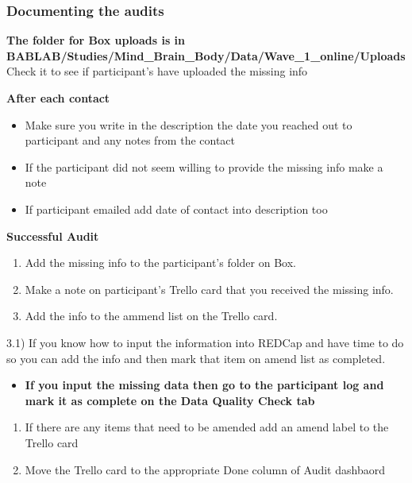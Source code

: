 \documentclass[
]{book}
\providecommand{\tightlist}{%
  \setlength{\itemsep}{0pt}\setlength{\parskip}{0pt}}
\begin{document}
\hypertarget{documenting-the-audits-1}{%
\subsubsection{\texorpdfstring{\textbf{Documenting the audits}}{Documenting the audits}}\label{documenting-the-audits-1}}

\textbf{The folder for Box uploads is in BABLAB/Studies/Mind\_Brain\_Body/Data/Wave\_1\_online/Uploads} Check it to see if participant's have uploaded the missing info

\textbf{After each contact}

\begin{itemize}
\item
  Make sure you write in the description the date you reached out to participant and any notes from the contact
\item
  If the participant did not seem willing to provide the missing info make a note
\item
  If participant emailed add date of contact into description too
\end{itemize}

\textbf{Successful Audit}

\begin{enumerate}
\def\labelenumi{\arabic{enumi})}
\item
  Add the missing info to the participant's folder on Box.
\item
  Make a note on participant's Trello card that you received the missing info.
\item
  Add the info to the ammend list on the Trello card.
\end{enumerate}

3.1) If you know how to input the information into REDCap and have time to do so you can add the info and then mark that item on amend list as completed.

\begin{itemize}
\tightlist
\item
  \textbf{If you input the missing data then go to the participant log and mark it as complete on the Data Quality Check tab}
\end{itemize}

\begin{enumerate}
\def\labelenumi{\arabic{enumi})}
\setcounter{enumi}{3}
\item
  If there are any items that need to be amended add an amend label to the Trello card
\item
  Move the Trello card to the appropriate Done column of Audit dashbaord
\end{enumerate}
\end{document}
